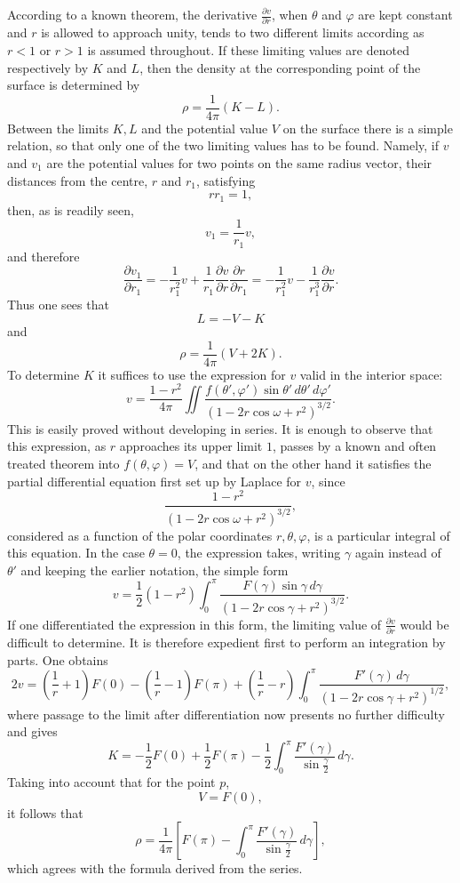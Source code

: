 \documentclass[11pt]{article}
\newcommand{\dd}{\,d}
\begin{document}
According to a known theorem, the derivative $\frac{\partial v}{\partial r}$, when $\theta$ and $\varphi$ are kept constant and $r$ is allowed to approach unity, tends to two different limits according as $r<1$ or $r>1$ is assumed throughout. If these limiting values are denoted respectively by $K$ and $L$, then the density at the corresponding point of the surface is determined by
\[
 \rho=\frac1{4\pi}(K-L).
\]
Between the limits $K,L$ and the potential value $V$ on the surface there is a simple relation, so that only one of the two limiting values has to be found. Namely, if $v$ and $v_1$ are the potential values for two points on the same radius vector, their distances from the centre, $r$ and $r_1$, satisfying
\[
 rr_1=1,
\]
then, as is readily seen,
\[
 v_1=\frac1{r_1}v,
\]
and therefore
\[
 \frac{\partial v_1}{\partial r_1}=-\frac1{r_1^2}v+\frac1{r_1}\frac{\partial v}{\partial r}\frac{\partial r}{\partial r_1}
 =-\frac1{r_1^2}v-\frac1{r_1^3}\frac{\partial v}{\partial r}.
\]
Thus one sees that
\[
 L=-V-K
\]
and
\[
 \rho=\frac1{4\pi}(V+2K).
\]
To determine $K$ it suffices to use the expression for $v$ valid in the interior space:
\[
 v=\frac{1-r^2}{4\pi}\iint\frac{f(\theta',\varphi')\sin\theta'\dd\theta'\dd\varphi'}{(1-2r\cos\omega+r^2)^{3/2}}.
\]
This is easily proved without developing in series. It is enough to observe that this expression, as $r$ approaches its upper limit $1$, passes by a known and often treated theorem into $f(\theta,\varphi)=V$, and that on the other hand it satisfies the partial differential equation first set up by Laplace for $v$, since
\[
 \frac{1-r^2}{(1-2r\cos\omega+r^2)^{3/2}},
\]
considered as a function of the polar coordinates $r,\theta,\varphi$, is a particular integral of this equation. In the case $\theta=0$, the expression takes, writing $\gamma$ again instead of $\theta'$ and keeping the earlier notation, the simple form
\[
 v=\frac12(1-r^2)\int_0^\pi\frac{F(\gamma)\sin\gamma\dd\gamma}{(1-2r\cos\gamma+r^2)^{3/2}}.
\]
If one differentiated the expression in this form, the limiting value of $\frac{\partial v}{\partial r}$ would be difficult to determine. It is therefore expedient first to perform an integration by parts. One obtains
\[
 2v=\left(\frac1r+1\right)F(0)-\left(\frac1r-1\right)F(\pi)
 +\left(\frac1r-r\right)\int_0^\pi\frac{F'(\gamma)\dd\gamma}{(1-2r\cos\gamma+r^2)^{1/2}},
\]
where passage to the limit after differentiation now presents no further difficulty and gives
\[
 K=-\frac12F(0)+\frac12F(\pi)-\frac12\int_0^\pi\frac{F'(\gamma)}{\sin\frac{\gamma}{2}}\dd\gamma.
\]
Taking into account that for the point $p$,
\[
 V=F(0),
\]
it follows that
\[
 \rho=\frac1{4\pi}\left[F(\pi)-\int_0^\pi\frac{F'(\gamma)}{\sin\frac{\gamma}{2}}\dd\gamma\right],
\]
which agrees with the formula derived from the series.
\end{document}
